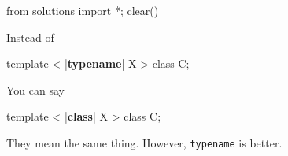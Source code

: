 \begin{python0}
from solutions import *; clear()
\end{python0}

Instead of

\begin{consolethree}[escapeinside=||]
template  < |\textbf{typename}| X >
class C{}; 
\end{consolethree}

You can say

\begin{consolethree}[escapeinside=||]
template  < |\textbf{class}| X >
class C{}; 
\end{consolethree}

They mean the same thing. However, \texttt{typename} is better.

